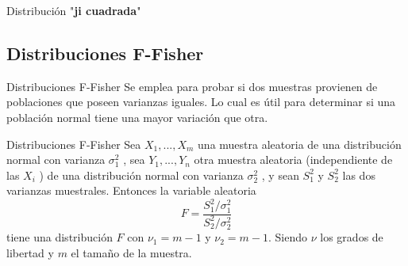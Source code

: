 \documentclass[11pt]{beamer}
\begin{document}
        \begin{frame}{Distribución "\textbf{ji cuadrada}"}

        \end{frame}
    \subsection*{Distribuciones F-Fisher}
      \begin{frame}{Distribuciones F-Fisher}
        Se emplea para probar si dos muestras provienen de poblaciones que poseen varianzas iguales. Lo cual es útil para determinar si una población normal tiene una mayor variación que otra.
        \pause
        \begin{block}{Distribuciones F-Fisher}
           Sea $X_1 , . . . , X_m$ una muestra aleatoria de una distribución normal con varianza $\sigma^2_1$ , sea
$Y_1 , . . . , Y_n$ otra muestra aleatoria (independiente de las $X_i$ ) de una distribución normal
con varianza  $\sigma^2_2$ , y sean $S^2_1$ y $S^2_2$ las dos varianzas muestrales. Entonces la variable aleatoria
           $$ F = \dfrac{S^2_1/\sigma^2_1}{S^2_2/\sigma^2_2}$$
           tiene una distribución $F$ con $\nu_1 = m - 1$ y $\nu_2 = m - 1$. Siendo $\nu$ los grados de libertad y $m$ el tamaño de la muestra.
        \end{block}
      \end{frame}
\end{document}

